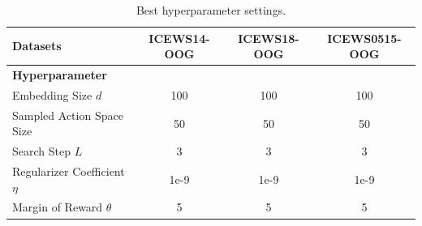 \documentclass[runningheads]{llncs}
\begin{document}
\begin{table}[htbp]
    \caption{Best hyperparameter settings.}
    \label{tab: best param}
      \centering
        \begin{tabular}{lccc} 
      \toprule %
     \multicolumn{1}{l}{\textbf{Datasets}} & \multicolumn{1}{c}{\textbf{ICEWS14-OOG}} & \multicolumn{1}{c}{\textbf{ICEWS18-OOG}} &\multicolumn{1}{c}{\textbf{ICEWS0515-OOG}} \\
      \midrule %
      \textbf{Hyperparameter} &   &  &   \\
       \midrule %
       Embedding Size $d$ & 100     &  100&  100 \\
       Sampled Action Space Size &  50   &  50&   50 \\
       Search Step $L$ &  3 &  3 & 3\\
       Regularizer Coefficient $\eta$ & 1e-9& 1e-9 & 1e-9\\
       Margin of Reward $\theta$ & 5 & 5 & 5\\
       
      \bottomrule %
    \end{tabular} 

\end{table}
\end{document}

